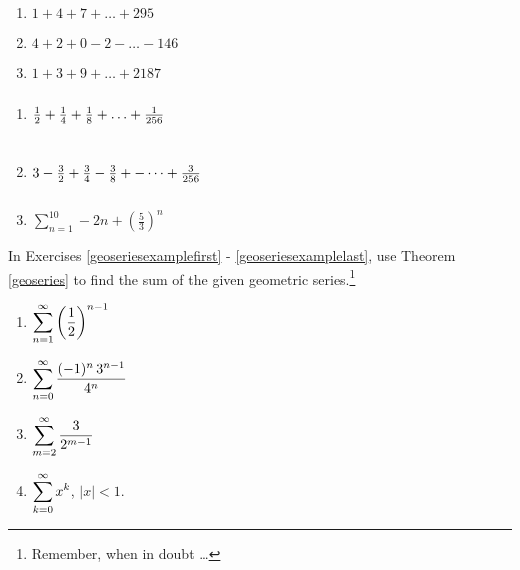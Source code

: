 \documentclass{ximera}
\begin{document}
\begin{multicols}{3}
\begin{enumerate}
\setcounter{enumi}{\value{HW}}

\item  $1+4+7+ \ldots +295$  

\item  $4+2+0-2- \ldots - 146$  

\item $1+3+9+ \ldots + 2187$ 
\setcounter{HW}{\value{enumi}}
\end{enumerate}
\end{multicols}

\begin{multicols}{3}
\begin{enumerate}
\setcounter{enumi}{\value{HW}}

\item  $\frac{1}{2} + \frac{1}{4} + \frac{1}{8} + \ldots + \frac{1}{256}\vphantom{\displaystyle \sum_{n = 1}^{10} -2n + \left(\frac{5}{3}\right)^{n}}$ 

\item $3 - \frac{3}{2} + \frac{3}{4} - \frac{3}{8}+- \dots +\frac{3}{256} \vphantom{\displaystyle \sum_{n = 1}^{10} -2n + \left(\frac{5}{3}\right)^{n}}$



\item $\displaystyle \sum_{n = 1}^{10} -2n + \left(\frac{5}{3}\right)^{n}$ \label{findsumformulalast}

\setcounter{HW}{\value{enumi}}
\end{enumerate}
\end{multicols}



In Exercises \ref{geoseriesexamplefirst} - \ref{geoseriesexamplelast}, use Theorem \ref{geoseries} to find the sum of the given geometric series.\footnote{Remember, when in doubt \ldots}

\begin{multicols}{4}
\begin{enumerate}
\setcounter{enumi}{\value{HW}}
\item $\displaystyle{ \sum_{n = 1}^{\infty} \left( \frac{1}{2} \right)^{n-1}}$  \label{geoseriesexamplefirst}
\item $\displaystyle{ \sum_{n = 0}^{\infty}  \dfrac{(-1)^n \, 3^{n-1}}{4^{n}}}$ 
\item $\displaystyle{ \sum_{m = 2}^{\infty}   \dfrac{3}{2^{m-1}}}$ 
\item $\displaystyle{ \sum_{k =0}^{\infty}  x^{k}}$, $|x|<1$.  \label{geoseriesexamplelast}
\setcounter{HW}{\value{enumi}}
\end{enumerate}

\end{multicols}
\end{document}
